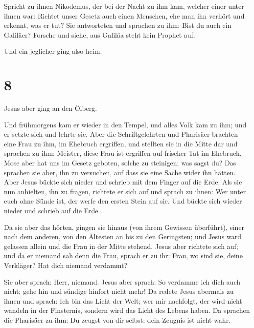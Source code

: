  Spricht zu ihnen Nikodemus, der bei der Nacht zu ihm
kam, welcher einer unter ihnen war:  Richtet unser Gesetz
auch einen Menschen, ehe man ihn verhört und erkennt, was er tut?
 Sie antworteten und sprachen zu ihm: Bist du auch ein
Galiläer? Forsche und siehe, aus Galiläa steht kein Prophet auf.

 Und ein jeglicher ging also heim.

\hypertarget{section-7}{%
\section{8}\label{section-7}}

 Jesus aber ging an den Ölberg.

 Und frühmorgens kam er wieder in den Tempel, und alles
Volk kam zu ihm; und er setzte sich und lehrte sie.  Aber
die Schriftgelehrten und Pharisäer brachten eine Frau zu ihm, im
Ehebruch ergriffen, und stellten sie in die Mitte dar  und
sprachen zu ihm: Meister, diese Frau ist ergriffen auf frischer Tat im
Ehebruch.  Mose aber hat uns im Gesetz geboten, solche zu
steinigen; was sagst du?  Das sprachen sie aber, ihn zu
versuchen, auf dass sie eine Sache wider ihn hätten. Aber Jesus bückte
sich nieder und schrieb mit dem Finger auf die Erde.  Als
sie nun anhielten, ihn zu fragen, richtete er sich auf und sprach zu
ihnen: Wer unter euch ohne Sünde ist, der werfe den ersten Stein auf
sie.  Und bückte sich wieder nieder und schrieb auf die
Erde.

 Da sie aber das hörten, gingen sie hinaus (von ihrem
Gewissen überführt), einer nach dem anderen, von den Ältesten an bis zu
den Geringsten; und Jesus ward gelassen allein und die Frau in der Mitte
stehend.  Jesus aber richtete sich auf; und da er niemand
sah denn die Frau, sprach er zu ihr: Frau, wo sind sie, deine Verkläger?
Hat dich niemand verdammt?

 Sie aber sprach: Herr, niemand. Jesus aber sprach: So
verdamme ich dich auch nicht; gehe hin und sündige hinfort nicht mehr!
 Da redete Jesus abermals zu ihnen und sprach: Ich bin
das Licht der Welt; wer mir nachfolgt, der wird nicht wandeln in der
Finsternis, sondern wird das Licht des Lebens haben.  Da
sprachen die Pharisäer zu ihm: Du zeugst von dir selbst; dein Zeugnis
ist nicht wahr.

